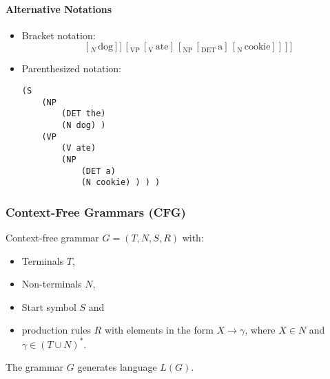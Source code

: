                 \paragraph{Alternative Notations} %
                    \begin{itemize}
                    	\item Bracket notation:
                    		\begin{equation*}
                        		[_\text{S} \, [_\text{NP} \, [_\text{DET} \, \text{the}] \, [_N \, \text{dog} ]] \, [_\text{VP} \, [_\text{V} \, \text{ate} ] \, [_\text{NP} \, [_\text{DET} \, \text{a}] \, [_\text{N} \, \text{cookie} ]]]]
                    		\end{equation*}
                    	\item Parenthesized notation:
                    		\begin{lstlisting}[numbers = none]
(S
	(NP
		(DET the)
		(N dog) )
	(VP
		(V ate)
		(NP
			(DET a)
			(N cookie) ) ) )
                    		\end{lstlisting}
                    \end{itemize}

            \subsubsection{Context-Free Grammars (CFG)} %
            	Context-free grammar \( G = (T, N, S, R) \) with:
                \begin{itemize}
                	\item Terminals \(T\),
                	\item Non-terminals \(N\),
                	\item Start symbol \(S\) and
                	\item production rules \(R\) with elements in the form \( X \rightarrow \gamma \), where \( X \in N \) and \( \gamma \in (T \cup N)^* \).
                \end{itemize}
            	The grammar \(G\) generates language \(L(G)\).

